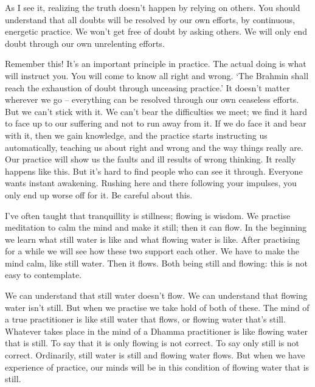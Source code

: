 As I see it, realizing the truth doesn't happen by relying on others. You should understand that all doubts will be resolved by our own efforts, by continuous, energetic practice. We won't get free of doubt by asking others. We will only end doubt through our own unrelenting efforts. 

Remember this! It's an important principle in practice. The actual doing is what will instruct you. You will come to know all right and wrong. `The Brahmin shall reach the exhaustion of doubt through unceasing practice.' It doesn't matter wherever we go -- everything can be resolved through our own ceaseless efforts. But we can't stick with it. We can't bear the difficulties we meet; we find it hard to face up to our suffering and not to run away from it. If we do face it and bear with it, then we gain knowledge, and the practice starts instructing us automatically, teaching us about right and wrong and the way things really are. Our practice will show us the faults and ill results of wrong thinking. It really happens like this. But it's hard to find people who can see it through. Everyone wants instant awakening. Rushing here and there following your impulses, you only end up worse off for it. Be careful about this. 

I've often taught that tranquillity is stillness; flowing is wisdom. We practise meditation to calm the mind and make it still; then it can flow. In the beginning we learn what still water is like and what flowing water is like. After practising for a while we will see how these two support each other. We have to make the mind calm, like still water. Then it flows. Both being still and flowing: this is not easy to contemplate. 

We can understand that still water doesn't flow. We can understand that flowing water isn't still. But when we practise we take hold of both of these. The mind of a true practitioner is like still water that flows, or flowing water that's still. Whatever takes place in the mind of a Dhamma practitioner is like flowing water that is still. To say that it is only flowing is not correct. To say only still is not correct. Ordinarily, still water is still and flowing water flows. But when we have experience of practice, our minds will be in this condition of flowing water that is still. 

